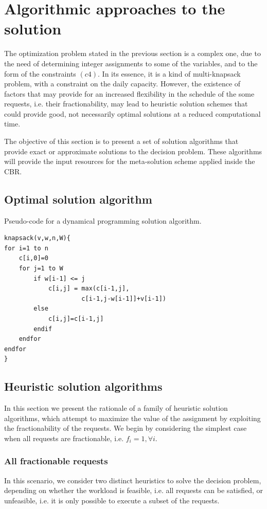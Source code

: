 \documentclass{IEEEtran}
\begin{document}
\section{Algorithmic approaches to the solution}
\label{alg}

The optimization problem stated in the previous section is a complex one, due to the need  of determining integer assignments to some of the variables, and to the form of the constraints $(c4)$. In its essence, it is a kind of multi-knapsack problem, with a constraint on the daily capacity. However, the existence of factors that may provide 
for an increased flexibility in the schedule of the some requests, i.e. their fractionability, may lead to heuristic solution schemes that could provide good, not necessarily  optimal solutions at a reduced computational time. 

The objective of this section is to present a set of solution algorithms that provide exact or approximate solutions to the decision problem. These algorithms will provide the input resources for the meta-solution scheme applied inside the CBR. 
 
\subsection{Optimal solution algorithm}

Pseudo-code for a dynamical programming solution algorithm. 

\lstset{tabsize=2}

\begin{lstlisting}[mathescape]
knapsack(v,w,n,W){
for i=1 to n
	c[i,0]=0
	for j=1 to W
		if w[i-1] <= j
			c[i,j] = max(c[i-1,j], 
			         c[i-1,j-w[i-1]]+v[i-1])
		else
			c[i,j]=c[i-1,j]
		endif
	endfor
endfor
}
\end{lstlisting}


\subsection{Heuristic solution algorithms}
In this section we present the rationale of a family of heuristic solution algorithms, which attempt to maximize the value of the assignment by exploiting the fractionability of the requests. We begin by considering the simplest case when all requests are fractionable, i.e. $f_i=1, \forall i$. 

\subsubsection{All fractionable requests} 
In this scenario, we consider two distinct heuristics to solve the decision problem, depending on whether the workload is feasible, i.e. all requests can be satisfied, or unfeasible, i.e. it is only possible to execute a subset of the requests. 
\end{document}
